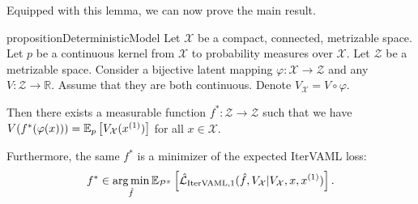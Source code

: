 Equipped with this lemma, we can now prove the main result.

\begin{restatable}{proposition}{DeterministicModel}\label{prop:cvaml:3_1}
    Let $\mathcal{X}$ be a compact, connected, metrizable space. Let $p$ be a continuous kernel from $\mathcal{X}$ to probability measures over $\mathcal{X}$. Let $\mathcal{Z}$ be a metrizable space. Consider a bijective latent mapping $\varphi: \mathcal{X} \rightarrow \mathcal{Z}$ and any $V: \mathcal{Z} \rightarrow \mathbb{R}$. Assume that they are both continuous. Denote $V_\mathcal{X} = V \circ \varphi$.
    
    Then there exists a measurable function $f^*: \mathcal{Z} \rightarrow \mathcal{Z}$ such that we have $V(f^*(\varphi(x))) = \mathbb{E}_{p}\left[  V_\mathcal{X}(x^{(1)}) \right]$ for all $x \in \mathcal{X}$.

    Furthermore, the same $f^*$ is a minimizer of the expected IterVAML loss:
    $$f^* \in \operatorname*{arg\,min}_{\hat{f}} \mathbb{E}_{\mathcal{P}^\pi}\left[  \hat{\mathcal{L}}_{\mathrm{IterVAML},1}(\hat{f},V_\mathcal{X}|V_\mathcal{X},x,x^{(1)}) \right].$$
\end{restatable}

